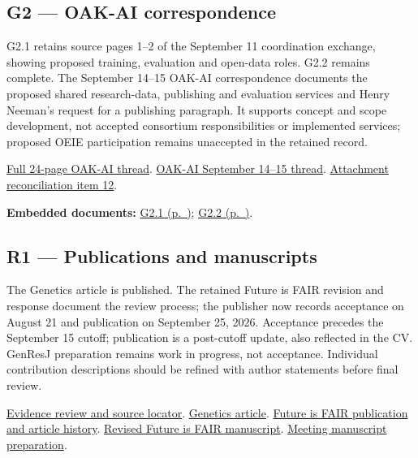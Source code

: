 \hypertarget{evidence-G2}{}
\subsection{G2 --- OAK-AI correspondence}
G2.1 retains source pages 1--2 of the September 11 coordination exchange, showing proposed training, evaluation and open-data roles. G2.2 remains complete. The September 14--15 OAK-AI correspondence documents the proposed shared research-data, publishing and evaluation services and Henry Neeman's request for a publishing paragraph. It supports concept and scope development, not accepted consortium responsibilities or implemented services; proposed OEIE participation remains unaccepted in the retained record.

\href{https://github.com/user-attachments/files/32247489/Re.NSF.proposal.OAK-AI.Hub.pdf}{Full 24-page OAK-AI thread}.
\href{https://github.com/user-attachments/files/32247512/Re.Potential.network-wide.evaluation.and.open.research.services.for.OAK-AI.Hub.pdf}{OAK-AI September 14--15 thread}.
\href{https://github.com/molikd/Molik-Tenure-Document/issues/4#issuecomment-5682646028}{Attachment reconciliation item 12}.

\par\medskip\noindent\textbf{Embedded documents:} \hyperref[supplement-G2.1]{G2.1 (p.~\pageref{supplement-G2.1})}; \hyperref[supplement-G2.2]{G2.2 (p.~\pageref{supplement-G2.2})}.

\hypertarget{evidence-R1}{}
\subsection{R1 --- Publications and manuscripts}
The Genetics article is published. The retained Future is FAIR revision and response document the review process; the publisher now records acceptance on August 21 and publication on September 25, 2026. Acceptance precedes the September 15 cutoff; publication is a post-cutoff update, also reflected in the CV. GenResJ preparation remains work in progress, not acceptance. Individual contribution descriptions should be refined with author statements before final review.

\href{https://github.com/molikd/Molik-Tenure-Document/issues/4#issuecomment-5682646028}{Evidence review and source locator}.
\href{https://doi.org/10.1093/genetics/iyag172}{Genetics article}.
\href{https://academic.oup.com/database/article/doi/10.1093/database/baag058/8835634}{Future is FAIR publication and article history}.
\href{https://github.com/user-attachments/files/32247880/MarranoA_Revised.pdf}{Revised Future is FAIR manuscript}.
\href{https://github.com/user-attachments/files/32247595/genresj.submission.prep.pdf}{Meeting manuscript preparation}.

